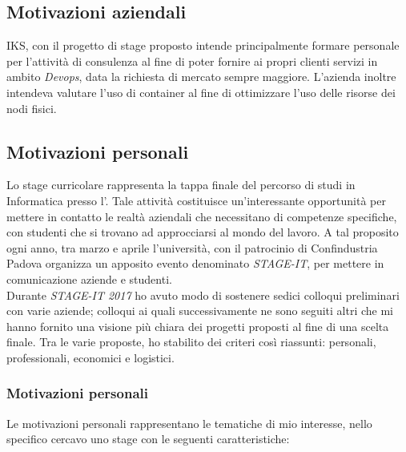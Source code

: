 \subsection{Motivazioni aziendali}

IKS, con il progetto di stage proposto intende principalmente formare personale per l'attività di consulenza al fine di poter fornire ai propri clienti servizi in ambito \textit{Devops}, data la richiesta di mercato sempre maggiore. L'azienda inoltre intendeva valutare l'uso di \gls{container} al fine di ottimizzare l'uso delle risorse dei nodi fisici.

\subsection{Motivazioni personali}

Lo stage curricolare rappresenta la tappa finale del percorso di studi in Informatica presso l'\myUni. Tale attività costituisce un'interessante opportunità per mettere in contatto le realtà aziendali che necessitano di competenze specifiche, con studenti che si trovano ad approcciarsi al mondo del lavoro. A tal proposito ogni anno, tra marzo e aprile l'università, con il patrocinio di Confindustria Padova organizza un apposito evento denominato \textit{STAGE-IT}, per mettere in comunicazione aziende e studenti.\\

Durante \textit{STAGE-IT 2017} ho avuto modo di sostenere sedici colloqui preliminari con varie aziende; colloqui ai quali successivamente ne sono seguiti altri che mi hanno fornito una visione più chiara dei progetti proposti al fine di una scelta finale. Tra le varie proposte, ho stabilito dei criteri così riassunti: personali, professionali, economici e logistici.

\subsubsection{Motivazioni personali}

Le motivazioni personali rappresentano le tematiche di mio interesse, nello specifico cercavo uno stage con le seguenti caratteristiche:

